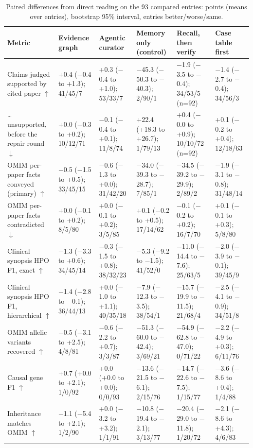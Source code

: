 \documentclass{article} %
\begin{document}
\begin{table}[!htbp]
\caption{Paired differences from direct reading on the 93 compared entries: points (means over entries), bootstrap 95\% interval, entries better/worse/same.}
\label{tab:app_paired}
\scriptsize
\begin{tabularx}{\linewidth}{>{\raggedright\arraybackslash}p{3.0cm}>{\centering\arraybackslash}X>{\centering\arraybackslash}X>{\centering\arraybackslash}X>{\centering\arraybackslash}X>{\centering\arraybackslash}X}
\toprule
Metric & Evidence graph & Agentic curator & Memory only (control) & Recall, then verify & Case table first \\
\midrule
Claims judged supported by cited paper $\uparrow$ & +0.4 ($-$0.4 to +1.3); 41/45/7 & +0.3 ($-$0.4 to +1.0); 53/33/7 & $-$45.3 ($-$50.3 to $-$40.3); 2/90/1 & $-$1.9 ($-$3.5 to $-$0.4); 34/53/5 (n=92) & $-$1.4 ($-$2.7 to $-$0.4); 34/56/3 \\
\ldots{} unsupported, before the repair round $\downarrow$ & +0.0 ($-$0.3 to +0.2); 10/12/71 & $-$0.1 ($-$0.4 to +0.1); 11/8/74 & +22.4 (+18.3 to +26.7); 1/79/13 & +0.4 ($-$0.0 to +0.9); 10/10/72 (n=92) & +0.1 ($-$0.2 to +0.4); 12/18/63 \\
OMIM per-paper facts conveyed (primary) $\uparrow$ & $-$0.5 ($-$1.5 to +0.5); 33/45/15 & $-$0.6 ($-$1.3 to +0.0); 31/42/20 & $-$34.0 ($-$39.3 to $-$28.7); 7/85/1 & $-$34.5 ($-$39.2 to $-$29.9); 2/89/2 & $-$1.9 ($-$3.1 to $-$0.8); 31/48/14 \\
OMIM per-paper facts contradicted $\downarrow$ & +0.0 ($-$0.1 to +0.2); 8/5/80 & +0.0 ($-$0.1 to +0.2); 3/5/85 & +0.1 ($-$0.2 to +0.5); 17/14/62 & $-$0.1 ($-$0.2 to +0.2); 16/7/70 & +0.1 ($-$0.1 to +0.3); 5/8/80 \\
Clinical synopsis HPO F1, exact $\uparrow$ & $-$1.3 ($-$3.3 to +0.6); 34/45/14 & $-$0.3 ($-$1.5 to +0.8); 38/32/23 & $-$5.3 ($-$9.2 to $-$1.5); 41/52/0 & $-$11.0 ($-$14.4 to $-$7.6); 25/63/5 & $-$2.0 ($-$3.9 to $-$0.1); 39/45/9 \\
Clinical synopsis HPO F1, hierarchical $\uparrow$ & $-$1.4 ($-$2.8 to $-$0.1); 36/44/13 & +0.0 ($-$1.0 to +1.1); 40/35/18 & $-$7.9 ($-$12.3 to $-$3.5); 38/54/1 & $-$15.7 ($-$19.9 to $-$11.5); 21/68/4 & $-$2.5 ($-$4.1 to $-$0.9); 34/51/8 \\
OMIM allelic variants recovered $\uparrow$ & $-$0.5 ($-$3.1 to +2.5); 4/8/81 & $-$0.6 ($-$2.2 to +0.7); 3/3/87 & $-$51.3 ($-$60.0 to $-$42.4); 3/69/21 & $-$54.9 ($-$62.8 to $-$47.0); 0/71/22 & $-$2.2 ($-$4.9 to +0.3); 6/11/76 \\
Causal gene F1 $\uparrow$ & +0.7 (+0.0 to +2.1); 1/0/92 & +0.0 (+0.0 to +0.0); 0/0/93 & $-$13.6 ($-$21.5 to $-$6.1); 2/15/76 & $-$14.7 ($-$22.6 to $-$7.5); 1/15/77 & $-$3.6 ($-$8.6 to +0.4); 1/4/88 \\
Inheritance matches OMIM $\uparrow$ & $-$1.1 ($-$5.4 to +2.1); 1/2/90 & +0.0 ($-$3.2 to +3.2); 1/1/91 & $-$10.8 ($-$19.4 to $-$2.1); 3/13/77 & $-$20.4 ($-$29.0 to $-$11.8); 1/20/72 & $-$2.1 ($-$8.6 to +4.3); 4/6/83 \\
\bottomrule
\end{tabularx}
\end{table}
\end{document}
